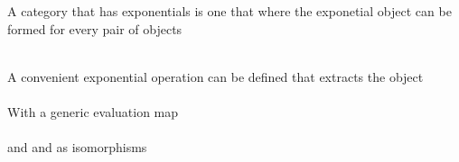 A category that has exponentials is one that  where the exponetial object can be
formed for every pair of objects

\begin{AgdaMultiCode}
\\
A convenient exponential operation can be defined that extracts the object
\\
\\
With a generic evaluation map
\\
\\
and  and  as isomorphisms
\\
\\
\end{AgdaMultiCode}
